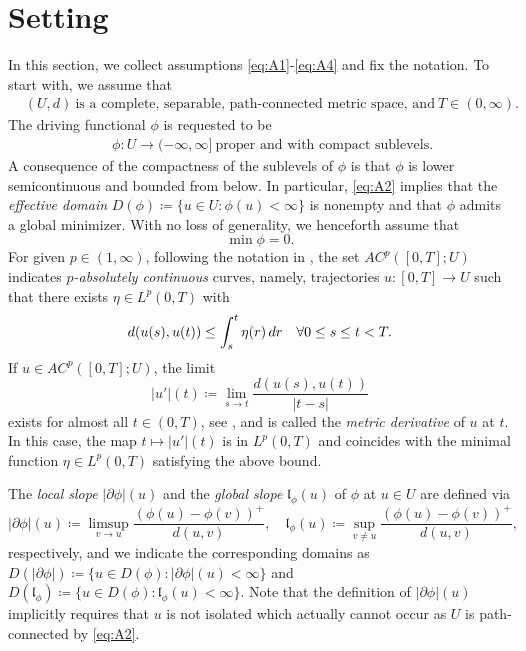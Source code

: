 \documentclass[10pt,a4paper]{amsart}
\newcommand{\dr}{{\rm d} r}
\renewcommand{\sl}{|\partial \phi|}
\newcommand{\gl}{\mathfrak{l}_\phi}
\begin{document}
 

 \section{Setting}\label{sec:setting}
In this section, we collect assumptions \eqref{eq:A1}-\eqref{eq:A4} and fix  the  notation.  To
start with, we assume that 
 \begin{align}
   &(U,d) \ \text{is a complete, separable, path-connected metric
     space, and} \  T \in (0,\infty). \label{eq:A1}
 \end{align}
 The driving functional  $\phi$  is  requested  to be 
  \begin{align}
   &\quad\phi: U \to (-\infty,\infty] \  \text{proper and with compact
     sublevels.}\label{eq:A2}
  \end{align}
A consequence of the compactness of the sublevels of $\phi$ is
 that $\phi$ is lower semicontinuous and bounded from below.
In particular, \eqref{eq:A2} implies that the  {\it effective domain} $D(\phi)\coloneqq\{u \in U :\phi(u)
<\infty \}$ is nonempty and that $\phi$ admits a global minimizer. With
                                no loss of generality, we henceforth 
                                assume that
\begin{equation}\label{eq:A_min0}
    \min \phi=0.
\end{equation}
For given $p \in (1,\infty)$,   following  the notation in \cite{Ambrosio08}, the set $AC^p([0,T];U)$
indicates {\it $p$-absolutely continuous} curves, namely, trajectories 
$u: [0,T]\to U$ such that there exists $\eta\in
L^p(0,T)$ with 
\begin{equation*}
d(u(s),u(t))\leq \int_s^t \eta(r)\,\dr \quad\forall 0 \leq
s\leq t < T.
\end{equation*}
If $u
\in AC^p([0,T];U) $, the limit
$$|u'|(t) \coloneqq \lim_{s\to t}\frac{d(u(s),u(t))}{|t-s|}$$
exists for almost  all  $t\in (0,T)$, see
\cite[Thm. 1.1.2, p.~24]{Ambrosio08}, and is called  the  {\it metric
derivative} of $u$ at $t$. In this case, the map
 $t \mapsto|u'|(t)$  is in $ L^p(0,T) $
and coincides with the minimal function $\eta\in L^p(0,T)$ satisfying the above bound.

 

The {\it local slope} $\sl(u)$ and the {\it global slope} $\gl(u)$ \cite{Ambrosio08,Cheeger99,DeGiorgi80} of $ \phi
$ at $ u \in U$ are defined via
$$
\sl(u) \coloneqq \limsup_{v \to u} \frac{(\phi(u) -
  \phi(v))^+}{d(u,v)}, \quad \gl(u) \coloneqq \sup_{v \not =u}\frac{(\phi(u) -
  \phi(v))^+}{d(u,v)},
$$
respectively, and we indicate the corresponding domains as  
$D(\sl) \coloneqq \{u \in D(\phi): \sl(u)<\infty\}$ and $D(\gl)  \coloneqq \{u \in D(\phi): \gl(u)<\infty\}$. Note that the definition
of $\sl(u)$ implicitly requires that $u$ is not isolated   which actually cannot occur as $U$ is  
path-connected by \eqref{eq:A2}.
\end{document}
